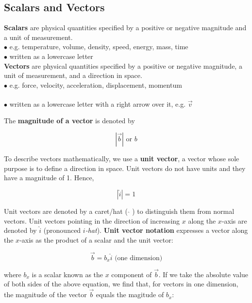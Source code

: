     \subsection{Scalars and Vectors}
        \textbf{Scalars} are physical quantities specified by a positive or negative magnitude and a unit of measurement. \\
        $\bullet$ e.g. temperature, volume, density, speed, energy, mass, time \\
        $\bullet$ written as a lowercase letter \\

        \noindent \textbf{Vectors} are physical quantities specified by a positive or negative magnitude, a unit of measurement, and a direction in space. \\
        $\bullet$ e.g. force, velocity, acceleration, displacement, momentum \\ \\
        $\bullet$ written as a lowercase letter with a right arrow over it, e.g. $\overrightarrow{v}$

        \noindent The \textbf{magnitude of a vector} is denoted by

        \[
            |\overrightarrow{b}| \text{ or } b
        \]

        \pagebreak

        \noindent To describe vectors mathematically, we use a \textbf{unit vector}, a vector whose sole purpose is to define a direction in space. Unit vectors do not have units and they have a magnitude of 1. Hence,

        \[
            |\hat{i}| = 1
        \]

        \noindent Unit vectors are denoted by a caret/hat ( $\hat{ }$ ) to distinguish them from normal vectors. Unit vectors pointing in the direction of increasing $x$ along the $x$-axis are denoted by
        $\hat{i}$ (pronounced \textit{$i$-hat}). \textbf{Unit vector notation} expresses a vector along the $x$-axis as the product of a scalar and the unit vector:

        \[
            \overrightarrow{b} = b_x \hat{i} \text{  (one dimension)}
        \]

        \noindent where $b_x$ is a scalar known as the $x$ component of $\overrightarrow{b}$. If we take the absolute value of both sides of the above equation, we find that, for vectors in one dimension, the magnitude
        of the vector $\overrightarrow{b}$ equals the magitude of $b_x$:

